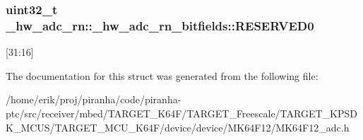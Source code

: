 \subsubsection[{\texorpdfstring{R\+E\+S\+E\+R\+V\+E\+D0}{RESERVED0}}]{\setlength{\rightskip}{0pt plus 5cm}uint32\+\_\+t \+\_\+hw\+\_\+adc\+\_\+rn\+::\+\_\+hw\+\_\+adc\+\_\+rn\+\_\+bitfields\+::\+R\+E\+S\+E\+R\+V\+E\+D0}\hypertarget{struct__hw__adc__rn_1_1__hw__adc__rn__bitfields_a77b3db2914be205381a26874f3c24bc1}{}\label{struct__hw__adc__rn_1_1__hw__adc__rn__bitfields_a77b3db2914be205381a26874f3c24bc1}
\mbox{[}31\+:16\mbox{]} 

The documentation for this struct was generated from the following file\+:\begin{DoxyCompactItemize}
\item 
/home/erik/proj/piranha/code/piranha-\/ptc/src/receiver/mbed/\+T\+A\+R\+G\+E\+T\+\_\+\+K64\+F/\+T\+A\+R\+G\+E\+T\+\_\+\+Freescale/\+T\+A\+R\+G\+E\+T\+\_\+\+K\+P\+S\+D\+K\+\_\+\+M\+C\+U\+S/\+T\+A\+R\+G\+E\+T\+\_\+\+M\+C\+U\+\_\+\+K64\+F/device/device/\+M\+K64\+F12/M\+K64\+F12\+\_\+adc.\+h\end{DoxyCompactItemize}
